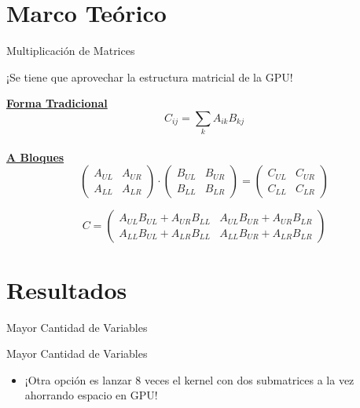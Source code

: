 \documentclass{beamer}
\begin{document}
\section{Marco Teórico}
\begin{frame}{Multiplicación de Matrices}
\begin{center}
	¡Se tiene que aprovechar la estructura matricial de la GPU!
\end{center}
\textbf{\underline{Forma Tradicional}}\\[0.5cm]
\[C_{ij}=\sum_k A_{ik}B_{kj}\]\\
\textbf{\underline{A Bloques}}\\[0.5cm]
\[ \begin{pmatrix} A_{UL}&A_{UR}\\A_{LL}&A_{LR}\end{pmatrix}\cdot\begin{pmatrix} B_{UL}&B_{UR}\\B_{LL}&B_{LR}\end{pmatrix}= \begin{pmatrix} C_{UL}&C_{UR}\\C_{LL}&C_{LR}\end{pmatrix} \]

\[ C=\begin{pmatrix} A_{UL}B_{UL}+A_{UR}B_{LL}& A_{UL}B_{UR}+A_{UR}B_{LR} \\A_{LL}B_{UL}+A_{LR}B_{LL}&A_{LL}B_{UR}+A_{LR}B_{LR}\end{pmatrix}  \]
	
\end{frame}
\section{Resultados}
\begin{frame}{Mayor Cantidad de Variables}

	
\end{frame}
\begin{frame}{Mayor Cantidad de Variables}
	
	\begin{block}{}
		\begin{itemize}
			\item ¡Otra opción es lanzar 8 veces el kernel con dos submatrices a la vez ahorrando espacio en GPU!
		\end{itemize}
	\end{block}
\end{frame}
\end{document}
